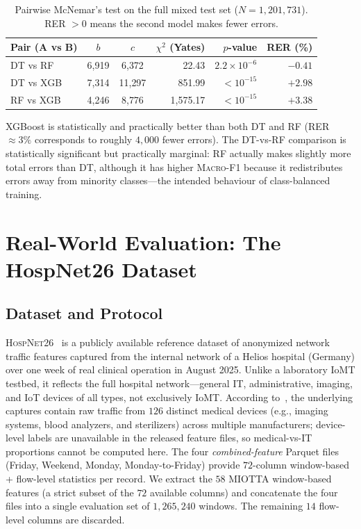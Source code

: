 \documentclass[runningheads]{llncs}
\newcommand{\macroF}{\textsc{Macro-F1}}
\begin{document}
\begin{table}[H]
\centering
\caption{Pairwise McNemar's test on the full mixed test set ($N = 1{,}201{,}731$). RER $> 0$ means the second model makes fewer errors.}\label{tab:mcnemar}
\small
\begin{tabular}{@{}lccrrr@{}}
\toprule
\textbf{Pair (A vs B)} & $b$ & $c$ & $\chi^{2}$ (Yates) & $p$-value & \textbf{RER (\%)} \\
\midrule
DT vs RF  & 6{,}919  & 6{,}372   & 22.43      & $2.2\times10^{-6}$ & $-0.41$ \\
DT vs XGB & 7{,}314  & 11{,}297  & 851.99     & $<10^{-15}$        & $+2.98$ \\
RF vs XGB & 4{,}246  & 8{,}776   & 1{,}575.17 & $<10^{-15}$        & $+3.38$ \\
\bottomrule
\end{tabular}
\end{table}

XGBoost is statistically and practically better than both DT and RF (RER $\approx 3\%$ corresponds to roughly $4{,}000$ fewer errors). The DT-vs-RF comparison is statistically significant but practically marginal: RF actually makes slightly more total errors than DT, although it has higher \macroF{} because it redistributes errors away from minority classes---the intended behaviour of class-balanced training.

\section{Real-World Evaluation: The HospNet26 Dataset}
\label{sec:results_2}

\subsection{Dataset and Protocol}

\textsc{HospNet26}~\cite{hospnet26,Domenech2026_cbms} is a publicly available reference dataset of anonymized network traffic features captured from the internal network of a Helios hospital (Germany) over one week of real clinical operation in August 2025. Unlike a laboratory IoMT testbed, it reflects the full hospital network---general IT, administrative, imaging, and IoT devices of all types, not exclusively IoMT. According to~\cite{Domenech2026_cbms}, the underlying captures contain raw traffic from $126$ distinct medical devices (e.g., imaging systems, blood analyzers, and sterilizers) across multiple manufacturers; device-level labels are unavailable in the released feature files, so medical-vs-IT proportions cannot be computed here. The four \emph{combined-feature} Parquet files (Friday, Weekend, Monday, Monday-to-Friday) provide $72$-column window-based + flow-level statistics per record. We extract the $58$ MIOTTA window-based features (a strict subset of the $72$ available columns) and concatenate the four files into a single evaluation set of $1{,}265{,}240$ windows. The remaining $14$ flow-level columns are discarded.
\end{document}
